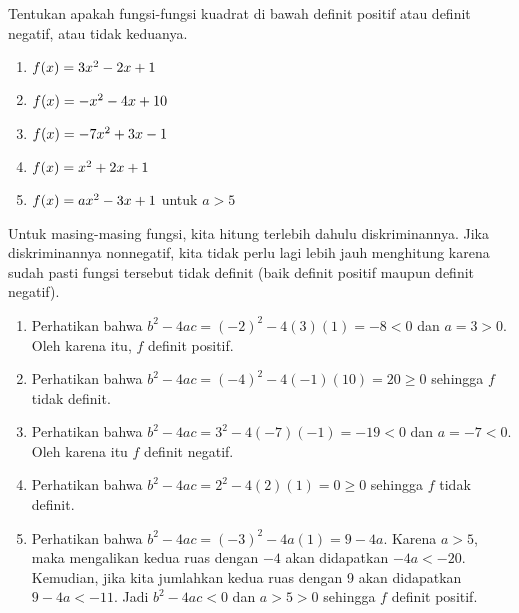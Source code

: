 	\begin{contoh}
		Tentukan apakah fungsi-fungsi kuadrat di bawah definit positif atau definit negatif, atau tidak keduanya.
		\begin{enumerate}
			\item $ \mathop{}\!{f}{\left({x}\right)} = 3x^{2} - 2x + 1 $
			\item $ \mathop{}\!{f}{\left({x}\right)} = -x^{2} - 4x + 10 $
			\item $ \mathop{}\!{f}{\left({x}\right)} = -7x^{2} + 3x - 1 $
			\item $ \mathop{}\!{f}{\left({x}\right)} = x^{2} + 2x + 1 $
			\item $ \mathop{}\!{f}{\left({x}\right)} = ax^{2} - 3x + 1 $ untuk $ a > 5 $
		\end{enumerate}
	\end{contoh}
	\begin{jawab}
		Untuk masing-masing fungsi, kita hitung terlebih dahulu diskriminannya. Jika diskriminannya nonnegatif, kita tidak perlu lagi lebih jauh menghitung karena sudah pasti fungsi tersebut tidak definit (baik definit positif maupun definit negatif).
		\begin{enumerate}
			\item Perhatikan bahwa $ b^{2} - 4ac = \left(-2\right)^{2} - 4\left(3\right)\left(1\right) = -8 < 0 $ dan $ a = 3 > 0 $. Oleh karena itu, $ f $ definit positif.
			\item Perhatikan bahwa $ b^{2} - 4ac = \left(-4\right)^{2} - 4\left(-1\right)\left(10\right) = 20 \geq 0 $ sehingga $ f $ tidak definit.
			\item Perhatikan bahwa $ b^{2} - 4ac = 3^{2} - 4\left(-7\right)\left(-1\right) = -19 < 0 $ dan $ a = -7 < 0 $. Oleh karena itu $ f $ definit negatif.
			\item Perhatikan bahwa $ b^{2} - 4ac = 2^{2} - 4\left(2\right)\left(1\right) = 0 \geq 0 $ sehingga $ f $ tidak definit.
			\item Perhatikan bahwa $ b^{2} - 4ac = \left(-3\right)^{2} - 4a\left(1\right) = 9 - 4a $. Karena $ a > 5 $, maka mengalikan kedua ruas dengan $ -4 $ akan didapatkan $ -4a < -20 $. Kemudian, jika kita jumlahkan kedua ruas dengan 9 akan didapatkan $ 9 - 4a < -11 $. Jadi $ b^{2} - 4ac < 0 $ dan $ a > 5 > 0 $ sehingga $ f $ definit positif.
		\end{enumerate}
	\end{jawab}
	
